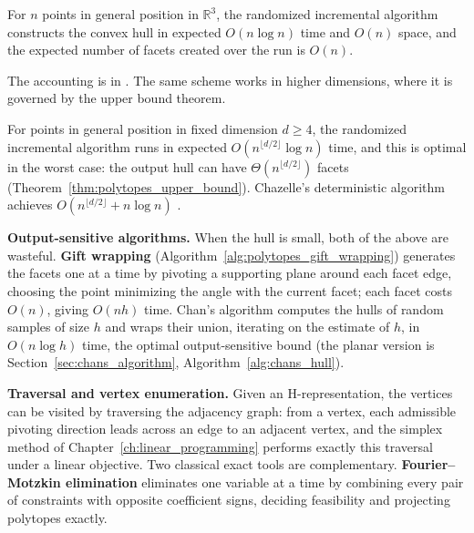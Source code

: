 \begin{theorem}\label{thm:polytopes_incremental_3d}
  For $n$ points in general position in $\mathbb{R}^3$, the randomized
  incremental algorithm constructs the convex hull in expected
  $O(n \log n)$ time and $O(n)$ space, and the expected number of facets
  created over the run is $O(n)$.
\end{theorem}

The accounting is in \cite{clarkson1989,deberg2008}. The same scheme works
in higher dimensions, where it is governed by the upper bound theorem.

\begin{theorem}\label{thm:polytopes_incremental_d}
  For points in general position in fixed dimension $d \ge 4$, the
  randomized incremental algorithm runs in expected
  $O(n^{\lfloor d/2 \rfloor} \log n)$ time, and this is optimal in the
  worst case: the output hull can have $\Theta(n^{\lfloor d/2 \rfloor})$
  facets (Theorem~\ref{thm:polytopes_upper_bound}). Chazelle's deterministic
  algorithm achieves $O(n^{\lfloor d/2 \rfloor} + n \log n)$
  \cite{chazelle1993}.
\end{theorem}

\textbf{Output-sensitive algorithms.} When the hull is small, both of the
above are wasteful. \textbf{Gift wrapping} \cite{chand1970}
(Algorithm~\ref{alg:polytopes_gift_wrapping}) generates the facets one at a
time by pivoting a supporting plane around each facet edge, choosing the
point minimizing the angle with the current facet; each facet costs $O(n)$,
giving $O(n h)$ time. Chan's algorithm \cite{chan1996} computes the hulls of
random samples of size $h$ and wraps their union, iterating on the estimate
of $h$, in $O(n \log h)$ time, the optimal output-sensitive bound (the
planar version is Section~\ref{sec:chans_algorithm},
Algorithm~\ref{alg:chans_hull}).

\textbf{Traversal and vertex enumeration.} Given an H-representation, the
vertices can be visited by traversing the adjacency graph: from a vertex,
each admissible pivoting direction leads across an edge to an adjacent
vertex, and the simplex method of Chapter~\ref{ch:linear_programming}
performs exactly this traversal under a linear objective. Two classical
exact tools are complementary. \textbf{Fourier--Motzkin elimination}
eliminates one variable at a time by combining every pair of constraints
with opposite coefficient signs, deciding feasibility and projecting
polytopes exactly.

